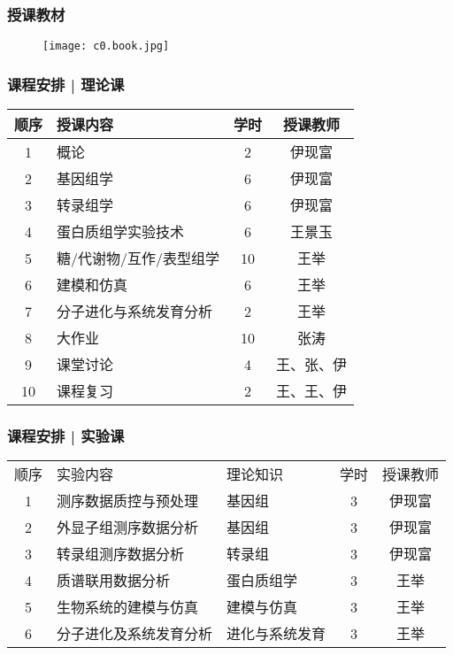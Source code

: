\begin{frame}
\end{frame}

\begin{frame}
  \frametitle{授课教材}
  \begin{figure}
    \centering
    \texttt{[image: c0.book.jpg]}
  \end{figure}
\end{frame}

\begin{frame}
  \frametitle{课程安排 | 理论课}
  \begin{table}
    \centering
    \begin{tabular}{clcc}
      \hline
      \rowcolor{blue!50}顺序 & 授课内容 & 学时 & 授课教师\\
      \hline
      1 & 概论 & 2 & 伊现富\\
      2 & 基因组学 & 6 & 伊现富\\
      3 & 转录组学 & 6 & 伊现富\\
      4 & 蛋白质组学实验技术 & 6 & 王景玉\\
      5 & 糖/代谢物/互作/表型组学 & 10 & 王举\\
      6 & 建模和仿真 & 6 & 王举\\
      7 & 分子进化与系统发育分析 & 2 & 王举\\
      8 & 大作业 & 10 & 张涛\\
      9 & 课堂讨论 & 4 & 王、张、伊\\
      10 & 课程复习 & 2 & 王、王、伊\\
      \hline
    \end{tabular}
  \end{table}
\end{frame}

\begin{frame}
  \frametitle{课程安排 | 实验课}
  \begin{table}
    \centering
    \begin{tabular}{cllcc}
      \hline
      \rowcolor{blue!50}顺序 & 实验内容 & 理论知识 & 学时 & 授课教师\\
      1 & 测序数据质控与预处理 & 基因组 & 3 & 伊现富\\
      2 & 外显子组测序数据分析 & 基因组 & 3 & 伊现富\\
      3 & 转录组测序数据分析 & 转录组 & 3 & 伊现富\\
      4 & 质谱联用数据分析& 蛋白质组学 & 3 & 王举\\
      5 & 生物系统的建模与仿真& 建模与仿真 & 3 & 王举\\
      6 & 分子进化及系统发育分析& 进化与系统发育 & 3 & 王举\\
      \hline
    \end{tabular}
  \end{table}
\end{frame}

